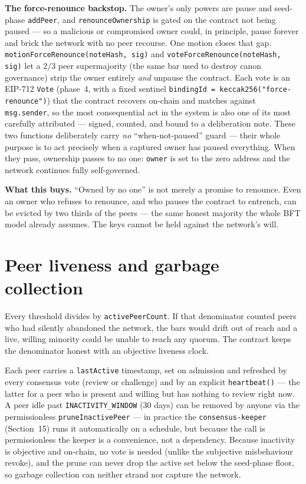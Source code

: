 \documentclass[11pt,a4paper]{article}
\begin{document}
\textbf{The force-renounce backstop.} The owner's only powers are pause
and seed-phase \texttt{addPeer}, and \texttt{renounceOwnership} is gated
on the contract not being paused --- so a malicious or compromised owner
could, in principle, pause forever and brick the network with no peer
recourse. One motion closes that gap.
\texttt{motionForceRenounce(noteHash, sig)} and
\texttt{voteForceRenounce(noteHash, sig)} let a $2/3$ peer supermajority
(the same bar used to destroy canon governance) strip the owner
entirely \emph{and} unpause the contract. Each vote is an EIP-712
\texttt{Vote} (phase~4, with a fixed sentinel \texttt{bindingId =
keccak256("force-renounce")}) that the contract recovers on-chain and
matches against \texttt{msg.sender}, so the most consequential act in
the system is also one of its most carefully attributed --- signed,
counted, and bound to a deliberation note. These two functions
deliberately carry \emph{no} ``when-not-paused'' guard --- their whole
purpose is to act precisely when a captured owner has paused
everything. When they pass, ownership passes to no one: \texttt{owner}
is set to the zero address and the network continues fully
self-governed.

\begin{notebox}
\textbf{What this buys.} ``Owned by no one'' is not merely a promise to
renounce. Even an owner who refuses to renounce, and who pauses the contract
to entrench, can be evicted by two thirds of the peers --- the same honest
majority the whole BFT model already assumes. The keys cannot be held against
the network's will.
\end{notebox}

\section{Peer liveness and garbage collection}

Every threshold divides by \texttt{activePeerCount}. If that denominator
counted peers who had silently abandoned the network, the bars would drift
out of reach and a live, willing minority could be unable to reach any
quorum. The contract keeps the denominator honest with an objective liveness
clock.

Each peer carries a \texttt{lastActive} timestamp, set on admission and
refreshed by every consensus vote (review or challenge) and by an explicit
\texttt{heartbeat()} --- the latter for a peer who is present and willing but
has nothing to review right now. A peer idle past
\texttt{INACTIVITY\_WINDOW} (30 days) can be removed by anyone via the
permissionless \texttt{pruneInactivePeer} --- in practice the
\texttt{consensus-keeper} (Section~15) runs it automatically on a schedule,
but because the call is permissionless the keeper is a convenience, not a
dependency. Because inactivity is objective and on-chain, no vote is needed
(unlike the subjective misbehaviour revoke), and the prune can never drop the
active set below the seed-phase floor, so garbage collection can neither
strand nor capture the network.
\end{document}
